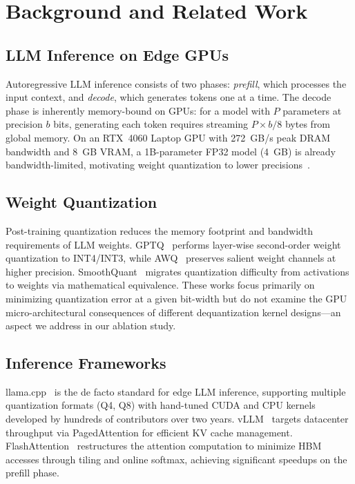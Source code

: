 \documentclass[conference]{IEEEtran}
\begin{document}
\section{Background and Related Work}

\subsection{LLM Inference on Edge GPUs}
Autoregressive LLM inference consists of two phases: \emph{prefill}, which processes the input context, and \emph{decode}, which generates tokens one at a time. The decode phase is inherently memory-bound on GPUs: for a model with $P$ parameters at precision $b$ bits, generating each token requires streaming $P \times b / 8$ bytes from global memory. On an RTX~4060 Laptop GPU with 272~GB/s peak DRAM bandwidth and 8~GB VRAM, a 1B-parameter FP32 model (4~GB) is already bandwidth-limited, motivating weight quantization to lower precisions~\cite{dettmers2022gptint8}.

\subsection{Weight Quantization}
Post-training quantization reduces the memory footprint and bandwidth requirements of LLM weights. GPTQ~\cite{frantar2022gptq} performs layer-wise second-order weight quantization to INT4/INT3, while AWQ~\cite{lin2023awq} preserves salient weight channels at higher precision. SmoothQuant~\cite{xiao2023smoothquant} migrates quantization difficulty from activations to weights via mathematical equivalence. These works focus primarily on minimizing quantization error at a given bit-width but do not examine the GPU micro-architectural consequences of different dequantization kernel designs---an aspect we address in our ablation study.

\subsection{Inference Frameworks}
llama.cpp~\cite{llamacpp} is the de facto standard for edge LLM inference, supporting multiple quantization formats (Q4, Q8) with hand-tuned CUDA and CPU kernels developed by hundreds of contributors over two years. vLLM~\cite{kwon2023vllm} targets datacenter throughput via PagedAttention for efficient KV cache management. FlashAttention~\cite{dao2022flashattention} restructures the attention computation to minimize HBM accesses through tiling and online softmax, achieving significant speedups on the prefill phase.
\end{document}
